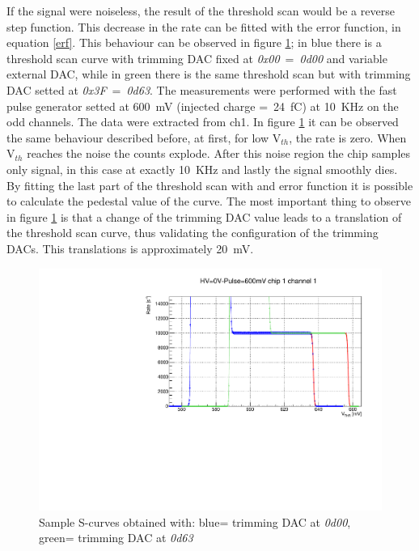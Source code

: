 If the signal were noiseless, the result of the threshold scan would be a reverse step function.
This decrease in the rate can be fitted with the error function, in equation \ref{erf}.
\newline
\noindent This behaviour can be observed in figure \ref{fig:thscanch0}; in blue there is a threshold scan curve with trimming DAC fixed at \textit{0x00}~=~\textit{0d00} and variable external DAC, while in green there is the same threshold scan but with trimming DAC setted at \textit{0x3F}~=~\textit{0d63}.
The measurements were performed with the fast pulse generator setted at 600~mV (injected charge =~24~fC) at 10~KHz on the odd channels. The data were extracted from ch1.
In figure \ref{fig:thscanch0} it can be observed the same behaviour described before, at first, for low V$_{th}$, the rate is zero.
When V$_{th}$ reaches the noise the counts explode.
After this noise region the chip samples only signal, in this case at exactly 10~KHz and lastly the signal smoothly dies. 
By fitting the last part of the threshold scan with and error function it is possible to calculate the pedestal value of the curve.
\noindent The most important thing to observe in figure \ref{fig:thscanch0} is that a change of the trimming DAC value leads to a translation of the threshold scan curve, thus validating the configuration of the trimming DACs.
This translations is approximately 20~mV.
\begin{figure}[H]
	\centering
	\includegraphics[width=0.8\linewidth]{IMG/ch5/DataDacConfig/ThScan_ch0.pdf}
	\caption{Sample S-curves obtained with: {\color{blue}blue}= trimming DAC at \textit{0d00},\\{\color{green}green}= trimming DAC at \textit{0d63}}
	\label{fig:thscanch0}
\end{figure}

